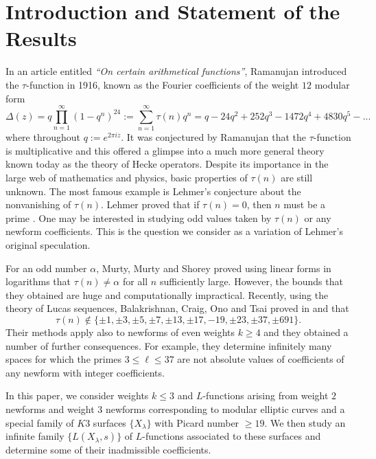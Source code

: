 \documentclass[12pt]{amsart}
\numberwithin{equation}{section}
\begin{document}
\section{Introduction and Statement of the Results}
In an article entitled \textit{``On certain arithmetical functions''}, Ramanujan introduced the $\tau$-function in 1916, known as the Fourier coefficients of the weight $12$ modular form $$\Delta(z)=q\prod_{n=1}^\infty (1-q^n)^{24}:=\sum_{n=1}^\infty \tau(n)q^n=q-24q^2+252q^3-1472q^4+4830q^5-...$$ where throughout $q:=e^{2\pi i z}$. It was conjectured by Ramanujan that the $\tau$-function is multiplicative and this offered a glimpse into a much more general theory known today as the theory of Hecke operators. Despite its importance in the large web of mathematics and physics, basic properties of $\tau(n)$ are still unknown. The most famous example is Lehmer's conjecture about the nonvanishing of $\tau(n)$. Lehmer proved that if $\tau(n)=0$, then $n$ must be a prime \cite{Lehmer}.  One may be interested in studying odd values taken by $\tau(n)$ or any newform coefficients. This is the question we consider as a variation of Lehmer's original speculation.


 For an odd number $\alpha$, Murty, Murty and Shorey \cite{MMS} proved using linear forms in logarithms that $\tau(n)\neq\alpha$ for all $n$ sufficiently large. However, the bounds that they obtained are huge and computationally impractical. Recently, using the theory of Lucas sequences, Balakrishnan, Craig, Ono and Tsai proved in \cite{BCO} and \cite{BCOT} that $$\tau(n)\not\in\{\pm1,\pm3,\pm5,\pm7,\pm13,\pm17,-19,\pm23,\pm37,\pm691\}.$$ Their methods apply also to newforms of even weights $k\geq 4$ and they obtained a number of further consequences. For example, they determine infinitely many spaces for which the primes $3\leq \ell\leq 37$ are not absolute values of coefficients of any newform with integer coefficients.

In this paper, we consider weights $k\leq 3$ and $L$-functions arising from weight $2$ newforms and weight $3$ newforms corresponding to modular elliptic curves and a special family of $K3$ surfaces $\{X_\lambda\}$ with Picard number $\ge 19$. We then study an infinite family $\{L(X_\lambda,s)\}$ of $L$-functions associated to these surfaces and determine some of their inadmissible coefficients.
\end{document}
